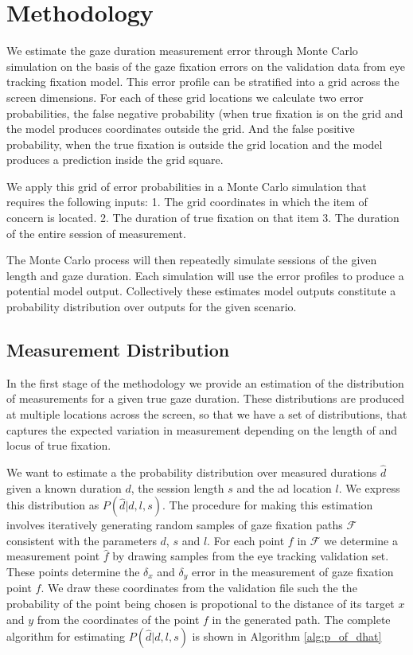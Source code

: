\documentclass[12pt,a4paper]{article}
\numberwithin{equation}{section}
\begin{document}
\section{Methodology}

We estimate the gaze duration measurement error through Monte Carlo simulation
on the basis of the gaze fixation errors on the validation data from eye tracking
fixation model. This error profile can be stratified into a grid across the screen dimensions. For each of these grid locations we calculate two error probabilities, the false negative probability (when true fixation is on the grid and the model produces coordinates outside the grid. And the false positive probability, when the true fixation is outside the grid location and the model produces a prediction inside the grid square.

We apply this grid of error probabilities in a Monte Carlo simulation that requires the following inputs:
1.	The grid coordinates in which the item of concern is located.
2.	The duration of true fixation on that item
3.	The duration of the entire session of measurement.

The Monte Carlo process will then repeatedly simulate sessions of the given length and gaze duration. Each simulation will use the error profiles to produce a potential model output. Collectively these estimates model outputs constitute a probability distribution over outputs for the given scenario.

\subsection{Measurement Distribution}

In the first stage of the methodology we provide an estimation of the distribution of 
measurements for a given true gaze duration. These distributions are produced at multiple locations
across the screen, so that we have a set of distributions, that captures the expected
variation in measurement depending on the length of and locus of true fixation.

We want to estimate a the probability distribution over measured durations $\hat{d}$ given a
known duration $d$, the session length $s$ and the ad location $l$. 
We express this distribution as $P(\hat{d}|d,l,s)$. The
procedure for making this estimation involves iteratively generating random samples
of gaze fixation paths $\mathcal{F}$ consistent with the parameters $d$, $s$ and $l$. 
For each point $f$ in $\mathcal{F}$ we determine a measurement point $\hat{f}$ 
by drawing samples from the eye tracking validation set. 
These points determine the $\delta_x$ and $\delta_y$ error in the measurement
of gaze fixation point $f$. We draw these coordinates from the validation file such the
the probability of the point being chosen is propotional to the distance of its target
$x$ and $y$ from the coordinates of the point $f$ in the generated path. The complete algorithm
for estimating $P(\hat{d}|d,l,s)$ is shown in Algorithm \ref{alg:p_of_dhat}    
\end{document}
